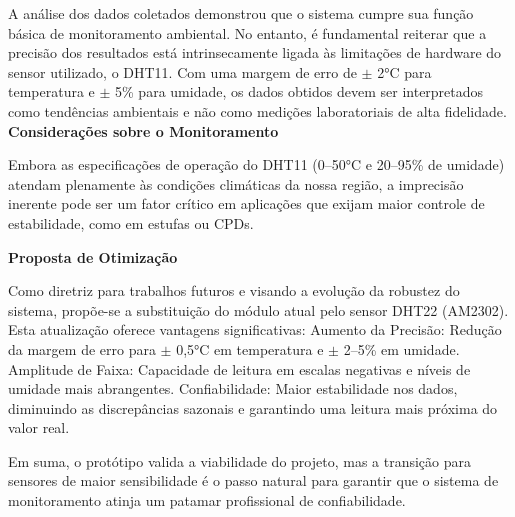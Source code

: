 A análise dos dados coletados demonstrou que o sistema cumpre sua função básica de monitoramento ambiental. No entanto, é fundamental reiterar que a precisão dos resultados está intrinsecamente ligada às limitações de hardware do sensor utilizado, o DHT11. Com uma margem de erro de $\pm$ 2°C para temperatura e $\pm$ 5\% para umidade, os dados obtidos devem ser interpretados como tendências ambientais e não como medições laboratoriais de alta fidelidade.
\textbf{Considerações sobre o Monitoramento} 

Embora as especificações de operação do DHT11 (0–50°C e 20–95\% de umidade) atendam plenamente às condições climáticas da nossa região, a imprecisão inerente pode ser um fator crítico em aplicações que exijam maior controle de estabilidade, como em estufas ou CPDs.

\textbf{Proposta de Otimização} 

Como diretriz para trabalhos futuros e visando a evolução da robustez do sistema, propõe-se a substituição do módulo atual pelo sensor DHT22 (AM2302). Esta atualização oferece vantagens significativas:
Aumento da Precisão: Redução da margem de erro para $\pm$ 0,5°C em temperatura e $\pm$ 2–5\% em umidade.
Amplitude de Faixa: Capacidade de leitura em escalas negativas e níveis de umidade mais abrangentes.
Confiabilidade: Maior estabilidade nos dados, diminuindo as discrepâncias sazonais e garantindo uma leitura mais próxima do valor real.

\vspace{0.5cm}

Em suma, o protótipo valida a viabilidade do projeto, mas a transição para sensores de maior sensibilidade é o passo natural para garantir que o sistema de monitoramento atinja um patamar profissional de confiabilidade.